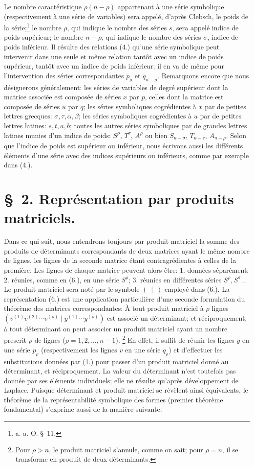 \documentclass[11pt]{article}
\begin{document}
Le nombre caractéristique $\rho(n-\rho)$ appartenant à une série symbolique (respectivement à une série de variables) sera appelé, d'après Clebsch, le poids de la série;\footnote{a. a. O. \S\ 11.} le nombre $\rho$, qui indique le nombre des séries $s$, sera appelé indice de poids supérieur; le nombre $n-\rho$, qui indique le nombre des séries $\sigma$, indice de poids inférieur. Il résulte des relations (4.) qu'une série symbolique peut intervenir dans une seule et même relation tantôt avec un indice de poids supérieur, tantôt avec un indice de poids inférieur; il en va de même pour l'intervention des séries correspondantes $p_\rho$ et $q_{n-\rho}$. Remarquons encore que nous désignerons généralement: les séries de variables de degré supérieur dont la matrice associée est composée de séries $x$ par $p$, celles dont la matrice est composée de séries $u$ par $q$; les séries symboliques cogrédientes à $x$ par de petites lettres grecques: $\sigma,\tau,\alpha,\beta$; les séries symboliques cogrédientes à $u$ par de petites lettres latines: $s,t,a,b$; toutes les autres séries symboliques par de grandes lettres latines munies d'un indice de poids: $S^\rho$, $T^\tau$, $A^\rho$ ou bien $S_{n-\sigma}$, $T_{n-\tau}$, $A_{n-\rho}$. Selon que l'indice de poids est supérieur ou inférieur, nous écrivons aussi les différents éléments d'une série avec des indices supérieurs ou inférieurs, comme par exemple dans (4.).

\clearpage
\section*{\S\ 2. Représentation par produits matriciels.}
Dans ce qui suit, nous entendrons toujours par \og produit matriciel \fg{} la somme des produits de déterminants correspondants de deux matrices ayant le même nombre de lignes, les lignes de la seconde matrice étant contragrédientes à celles de la première. Les lignes de chaque matrice peuvent alors être: 1. données séparément; 2. réunies, comme en (6.), en une série $S^\rho$; 3. réunies en différentes séries $S^\rho,S^\sigma\ldots$ Le produit matriciel sera noté par le symbole $(\ \mid\ )$ employé dans (6.). La représentation (6.) est une application particulière d'une seconde formulation du théorème des matrices correspondantes: \og À tout produit matriciel à $\rho$ lignes $(v^{(1)}v^{(2)}\cdots v^{(\rho)}\mid y^{(1)}\cdots y^{(\rho)})$ est associé un déterminant; et réciproquement, à tout déterminant on peut associer un produit matriciel ayant un nombre prescrit $\rho$ de lignes ($\rho=1,2,\ldots,n-1$). \fg{}\footnote{Pour $\rho>n$, le produit matriciel s'annule, comme on sait; pour $\rho=n$, il se transforme en produit de deux déterminants.} En effet, il suffit de réunir les lignes $y$ en une série $p_\rho$ (respectivement les lignes $v$ en une série $q_\rho$) et d'effectuer les substitutions données par (1.) pour passer d'un produit matriciel donné au déterminant, et réciproquement. La valeur du déterminant n'est toutefois pas donnée par ses éléments individuels; elle ne résulte qu'après développement de Laplace. Puisque déterminant et produit matriciel se révèlent ainsi équivalents, le théorème de la représentabilité symbolique des formes (premier théorème fondamental) s'exprime aussi de la manière suivante:
\end{document}
